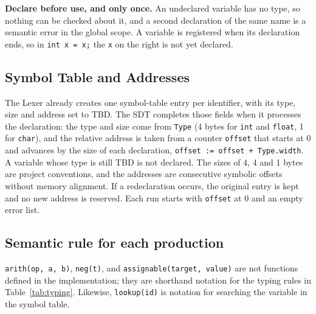 \documentclass[12pt,letterpaper]{article}
\newcommand{\cod}[1]{\texttt{#1}} %
\begin{document}
\textbf{Declare before use, and only once.} An undeclared variable has no type, so nothing can be checked about it, and a second declaration of the same name is a semantic error in the global scope. A variable is registered when its declaration ends, so in \cod{int x = x;} the \cod{x} on the right is not yet declared.

\subsection{Symbol Table and Addresses}

The Lexer already creates one symbol-table entry per identifier, with its type, size and address set to TBD. The SDT completes those fields when it processes the declaration: the type and size come from \cod{Type} (4 bytes for \cod{int} and \cod{float}, 1 for \cod{char}), and the relative address is taken from a counter \cod{offset} that starts at 0 and advances by the size of each declaration, \cod{offset := offset + Type.width}. A variable whose type is still TBD is not declared. The sizes of 4, 4 and 1 bytes are project conventions, and the addresses are consecutive symbolic offsets without memory alignment. If a redeclaration occurs, the original entry is kept and no new address is reserved. Each run starts with \cod{offset} at 0 and an empty error list.

\subsection{Semantic rule for each production}
\texttt{arith(op, a, b)}, \texttt{neg(t)}, and \texttt{assignable(target, value)} are not functions defined in the implementation; they are shorthand notation for the typing rules in Table~\ref{tab:typing}. Likewise, \texttt{lookup(id)} is notation for searching the variable in the symbol table.
\end{document}

